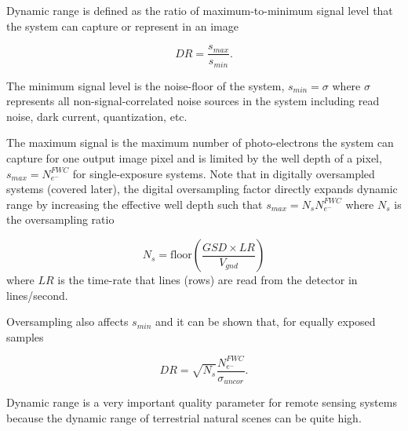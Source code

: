 \documentclass[]{spieman}  %
\begin{document}
Dynamic range is defined as the ratio of maximum-to-minimum signal level that the system can capture or represent in an image

\begin{equation*}
    DR = \frac{s_{max}}{s_{min}}.
\end{equation*}

The minimum signal level is the noise-floor of the system, $s_{min} = \sigma$ where $\sigma$ represents all non-signal-correlated noise sources in the system including read noise, dark current, quantization, etc.

The maximum signal is the maximum number of photo-electrons the system can capture for one output image pixel and is limited by the well depth of a pixel, $s_{max} = N_{e^-}^{FWC}$ for single-exposure systems.  Note that in digitally oversampled systems (covered later), the digital oversampling factor directly expands dynamic range by increasing the effective well depth such that $s_{max} = N_s N_{e^-}^{FWC}$ where $N_s$ is the oversampling ratio

\begin{equation}
    N_s = \text{floor}\left(\frac{GSD \times LR}{V_{gnd}}\right)
    \label{eq:N_s}
\end{equation}
where $LR$ is the time-rate that lines (rows) are read from the detector in lines/second.

Oversampling also affects $s_{min}$ and it can be shown that, for equally exposed samples

\begin{equation}
    DR = \sqrt{N_s}\frac{N_{e^-}^{FWC}}{\sigma_{uncor}}.
\label{eq:DR_OS}
\end{equation}

Dynamic range is a very important quality parameter for remote sensing systems because the dynamic range of terrestrial natural scenes can be quite high. 
\end{document}
